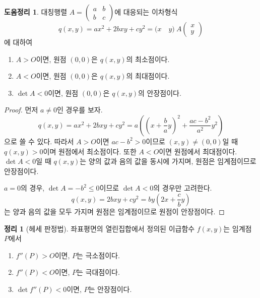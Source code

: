 \documentclass[unfonts,oneside,a4paper]{oblivoir}
\theoremstyle{definition}
\theoremstyle{theorem}
\newtheorem{theorem}{정리}[subsubsection]
\newtheorem{lemma}{도움정리}[subsubsection]
\begin{document}
\begin{lemma} \label{lem:quadratic}
    대칭행렬 $A = \begin{pmatrix}a & b\\b & c\end{pmatrix}$에 대응되는 이차형식
    \begin{equation*}
        q(x, y) = ax^2 + 2bxy + cy^2 = \bigl(x \quad y\bigr)\ A \begin{pmatrix}x\\y\end{pmatrix}
    \end{equation*}
    에 대하여
    \begin{enumerate}
        \item $A > O$이면, 원점 $(0, 0)$은 $q(x, y)$의 최소점이다.
        \item $A < O$이면, 원점 $(0, 0)$은 $q(x, y)$의 최대점이다.
        \item $\det A < 0$이면, 원점 $(0, 0)$은 $q(x, y)$의 안장점이다.
    \end{enumerate}
\end{lemma}

\begin{proof}
    먼저 $a \neq 0$인 경우를 보자.
    \begin{equation*}
        q(x, y) = ax^2 + 2bxy + cy^2 = a \left(\left(x + \frac ba y\right)^2 + \frac{ac - b^2}{a^2} y^2\right)
    \end{equation*}
    으로 쓸 수 있다.
    따라서 $A > O$이면 $ac- b^2 > 0$이므로 $(x, y) \neq (0, 0)$일 때 $q(x, y) > 0$이며 원점에서 최소점이다.
    또한 $A < O$이면 원점에서 최대점이다.
    $\det A < 0$일 때 $q(x, y)$는 양의 값과 음의 값을 동시에 가지며, 원점은 임계점이므로 안장점이다.
    
    $a = 0$의 경우, $\det A = -b^2 \leq 0$이므로 $\det A < 0$의 경우만 고려한다.
    \begin{equation*}
        q(x, y) = 2bxy + cy^2 = by \left(2x + \frac cby\right)
    \end{equation*}
    는 양과 음의 값을 모두 가지며 원점은 임계점이므로 원점이 안장점이다.
\end{proof}

\begin{theorem}[헤세 판정법]
    좌표평면의 열린집합에서 정의된 이급함수 $f(x, y)$는 임계점 $P$에서
    \begin{enumerate}
        \item $f''(P) > O$이면, $P$는 극소점이다.
        \item $f''(P) < O$이면, $P$는 극대점이다.
        \item $\det f''(P) < 0$이면, $P$는 안장점이다.
    \end{enumerate}
\end{theorem}
\end{document}

